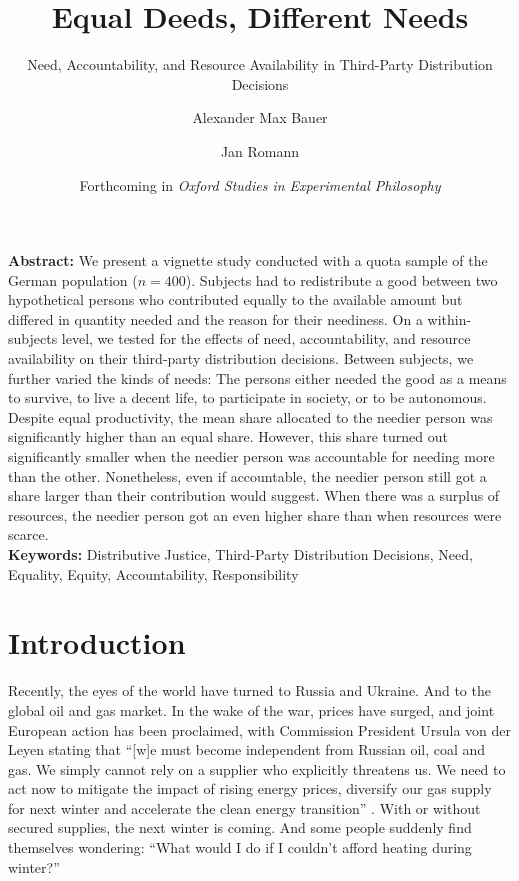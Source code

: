 \documentclass[egregdoesnotlikesansseriftitles]{scrartcl}
\title{Equal Deeds, Different Needs}
\subtitle{Need, Accountability, and Resource Availability in Third-Party Distribution Decisions}
\author[1]{Alexander Max Bauer}
\author[2]{Jan Romann}
\affil[1]{ Department of Philosophy, University of Oldenburg,

Corresponding Author, E-Mail: \href{mailto:alexander.max.bauer@uni-oldenburg.de}{alexander.max.bauer@uni-oldenburg.de}}
\affil[2]{ SOCIUM Research Center on Inequality and Social Policy, University of Bremen}
\date{\small Forthcoming in \textit{Oxford Studies in Experimental Philosophy}}
\begin{document}
\maketitle

\vspace{\fill}
\noindent\textbf{Abstract:} We present a vignette study conducted with a quota sample of the German population ($n=400$).
Subjects had to redistribute a good between two hypothetical persons who contributed equally to the available amount but differed in quantity needed and the reason for their neediness.
On a within-subjects level, we tested for the effects of need, accountability, and resource availability on their third-party distribution decisions.
Between subjects, we further varied the kinds of needs: The persons either needed the good as a means to survive, to live a decent life, to participate in society, or to be autonomous.
Despite equal productivity, the mean share allocated to the needier person was significantly higher than an equal share.
However, this share turned out significantly smaller when the needier person was accountable for needing more than the other.
Nonetheless, even if accountable, the needier person still got a share larger than their contribution would suggest.
When there was a surplus of resources, the needier person got an even higher share than when resources were scarce.\\[2ex]

\noindent\textbf{Keywords:} Distributive Justice, Third-Party Distribution Decisions, Need, Equality, Equity, Accountability, Responsibility\\[0.5ex]


\newpage
\section{Introduction}\label{sec:introduction}
Recently, the eyes of the world have turned to Russia and Ukraine.
And to the global oil and gas market.
In the wake of the war, prices have surged, and joint European action has been proclaimed, with Commission President Ursula von der Leyen stating that ``[w]e must become independent from Russian oil, coal and gas.
We simply cannot rely on a supplier who explicitly threatens us. 
We need to act now to mitigate the impact of rising energy prices, diversify our gas supply for next winter and accelerate the clean energy transition'' \citep[par. 3]{european_repowereu_2022}.
With or without secured supplies, the next winter is coming.
And some people suddenly find themselves wondering: ``What would I do if I couldn't afford heating during winter?''
\end{document}
